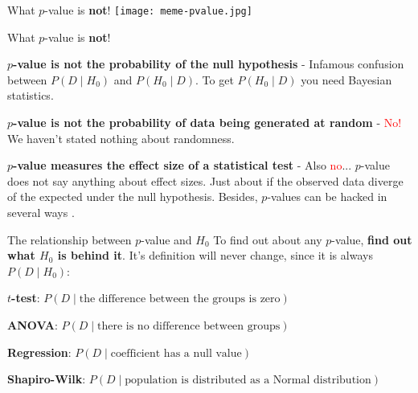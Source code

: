 \begin{frame}{What $p$-value is \textbf{not}!}
	\centering
	\texttt{[image: meme-pvalue.jpg]}
\end{frame}

\begin{frame}{What $p$-value is \textbf{not}!}
	\begin{vfilleditems}
		\item \textbf{$p$-value is not the probability of the null hypothesis}
		- Infamous confusion between $P(D \mid H_0)$ and $P(H_0 \mid D)$.
		To get $P(H_0 \mid D)$ you need Bayesian statistics.
		\item \textbf{$p$-value is not the probability of data being generated at random}
		- \textcolor{red}{No!}
		We haven't stated nothing about randomness.
		\item \textbf{$p$-value measures the effect size of a statistical test}
		- Also \textcolor{red}{no}... $p$-value does not say anything about effect sizes.
		Just about if the observed data diverge of the expected under the null hypothesis.
		Besides, $p$-values can be hacked in several ways \parencite{head2015extent}.
	\end{vfilleditems}
\end{frame}

\begin{frame}{The relationship between $p$-value and $H_0$}
	To find out about any $p$-value, \textbf{find out what $H_0$ is behind it}.
	It's definition will never change, since it is always $P(D \mid H_0)$:
	\begin{vfilleditems}
		\item \textbf{$t$-test}: $P(D \mid \text{the difference between the groups is zero})$ \item \textbf{ANOVA}: $P(D \mid \text{there is no difference between groups})$ \item \textbf{Regression}: $P(D \mid \text{coefficient has a null value})$ \item \textbf{Shapiro-Wilk}: $P(D \mid \text{population is distributed as a Normal distribution})$
	\end{vfilleditems}
\end{frame}

